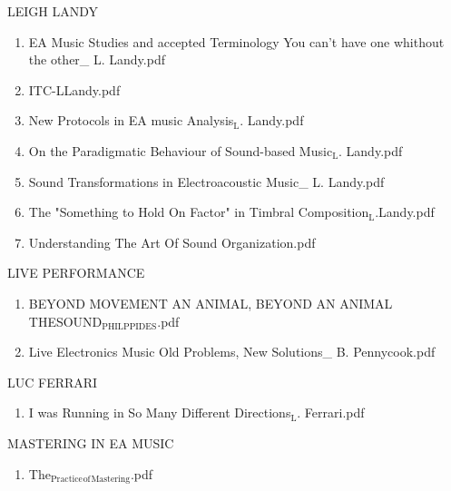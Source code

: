 \documentclass[11pt]{article}
\begin{document}
\item LEIGH LANDY
\label{sec-1-1-1-1-49-1-19}
\begin{enumerate}
\item EA Music Studies and accepted Terminology You can't have one whithout the other\_ L. Landy.pdf
\label{sec-1-1-1-1-49-1-19-1}

\item ITC-LLandy.pdf
\label{sec-1-1-1-1-49-1-19-2}

\item New Protocols in EA music Analysis$_{\text{L}}$. Landy.pdf
\label{sec-1-1-1-1-49-1-19-3}

\item On the Paradigmatic Behaviour of Sound-based Music$_{\text{L}}$. Landy.pdf
\label{sec-1-1-1-1-49-1-19-4}

\item Sound Transformations in Electroacoustic Music\_ L. Landy.pdf
\label{sec-1-1-1-1-49-1-19-5}

\item The "Something to Hold On Factor" in Timbral Composition$_{\text{L}}$.Landy.pdf
\label{sec-1-1-1-1-49-1-19-6}

\item Understanding The Art Of Sound Organization.pdf
\label{sec-1-1-1-1-49-1-19-7}
\end{enumerate}

\item LIVE PERFORMANCE
\label{sec-1-1-1-1-49-1-20}
\begin{enumerate}
\item BEYOND MOVEMENT AN ANIMAL, BEYOND AN ANIMAL THESOUND$_{\text{PHILPPIDES}}$.pdf
\label{sec-1-1-1-1-49-1-20-1}

\item Live Electronics Music Old Problems, New Solutions\_ B. Pennycook.pdf
\label{sec-1-1-1-1-49-1-20-2}
\end{enumerate}

\item LUC FERRARI
\label{sec-1-1-1-1-49-1-21}
\begin{enumerate}
\item I was Running in So Many Different Directions$_{\text{L}}$. Ferrari.pdf
\label{sec-1-1-1-1-49-1-21-1}
\end{enumerate}

\item MASTERING IN EA MUSIC
\label{sec-1-1-1-1-49-1-22}
\begin{enumerate}
\item The$_{\text{Practice}}$$_{\text{of}}$$_{\text{Mastering}}$.pdf
\label{sec-1-1-1-1-49-1-22-1}
\end{enumerate}
\end{document}
